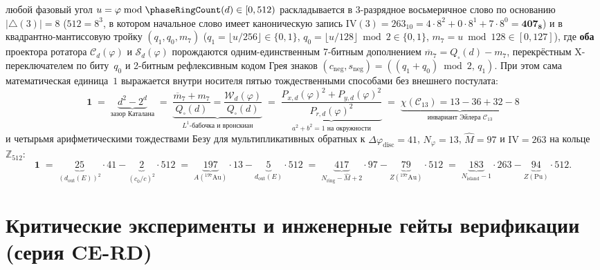 \begin{theorem}
\begin{enumerate}[label=\textbf{(\roman*)},leftmargin=*]
\begin{itemize}[noitemsep,leftmargin=*]
\begin{enumerate}[label=(\alph*),noitemsep]
      любой фазовый угол $u = \varphi\bmod\phaseRingCount(d)\in[0,512)$ раскладывается в 3-разрядное восьмеричное слово по основанию $|{\triangle}(3)|=8$ ($512=8^3$, в котором начальное слово имеет каноническую запись $\mathrm{IV}(3) = 263_{10} = 4\cdot 8^2 + 0\cdot 8^1 + 7\cdot 8^0 = \mathbf{407_8}$) и в квадрантно-мантиссовую тройку $(q_1,q_0,m_7)$ ($q_1=\lfloor u/256\rfloor\in\{0,1\}$, $q_0=\lfloor u/128\rfloor\bmod 2\in\{0,1\}$, $m_7 = u\bmod 128\in[0,127]$), где \textbf{оба} проектора ротатора $\mathcal{C}_d(\varphi)$ и $\mathcal{S}_d(\varphi)$ порождаются одним-единственным 7-битным дополнением $\overline{m}_7 = Q_\square(d)-m_7$, перекрёстным X-переключателем по биту~$q_0$ и 2-битным рефлексивным кодом Грея знаков $(c_{\mathrm{neg}},s_{\mathrm{neg}}) = ((q_1+q_0)\bmod 2,\,q_1)$. При этом сама математическая единица~$1$ выражается внутри носителя пятью тождественными способами без внешнего постулата:
      \[
        \mathbf{1}
        \;=\; \underbrace{d^2 - 2^d}_{\text{зазор Каталана}}
        \;=\; \underbrace{\frac{\overline{m}_7 + m_7}{Q_\square(d)} = \frac{\mathcal{W}_d(\varphi)}{Q_\square(d)}}_{L^1\text{-бабочка и вронскиан}}
        \;=\; \underbrace{\frac{P_{x,d}(\varphi)^2 + P_{y,d}(\varphi)^2}{P_{r,d}(\varphi)^2}}_{a^2+b^2=1\text{ на окружности}}
        \;=\; \underbrace{\chi(\mathcal{C}_{13}) = 13-36+32-8}_{\text{инвариант Эйлера }\mathcal{C}_{13}}
      \]
      и четырьмя арифметическими тождествами Безу для мультипликативных обратных к $\Delta\varphi_{\mathrm{disc}}=41$, $N_\varphi=13$, $\hat{M}=97$ и $\mathrm{IV}=263$ на кольце $\mathbb{Z}_{512}$:
      \[
        \mathbf{1}
        \;=\; \underbrace{25}_{(d_{\mathrm{out}}(E))^2}\!\cdot 41 - \underbrace{2}_{(c_0/c)^2}\!\cdot 512
        \;=\; \underbrace{197}_{A(^{197}\mathrm{Au})}\!\cdot 13 - \underbrace{5}_{d_{\mathrm{out}}(E)}\!\cdot 512
        \;=\; \underbrace{417}_{N_{\mathrm{ring}}-\hat{M}+2}\!\cdot 97 - \underbrace{79}_{Z(^{197}\mathrm{Au})}\!\cdot 512
        \;=\; \underbrace{183}_{N_{\mathrm{island}}-1}\!\cdot 263 - \underbrace{94}_{Z(\mathrm{Pu})}\!\cdot 512.
      \]
    \end{enumerate}
  \end{itemize}
\end{enumerate}
\end{theorem}





\chapter{Критические эксперименты и инженерные гейты верификации (серия CE-RD)}
\label{ch:applied-critical-experiments}

